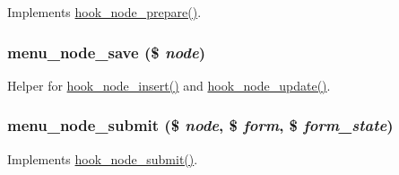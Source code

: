 Implements \hyperlink{group__node__api__hooks_ga4bbe7320bd52fc6183920c8be2d9d4f6}{hook\_\-node\_\-prepare()}. \hypertarget{menu_8module_a8d7834b73f1a9d55e4bc705b6fca3fbf}{
\subsubsection[{menu\_\-node\_\-save}]{\setlength{\rightskip}{0pt plus 5cm}menu\_\-node\_\-save (\$ {\em node})}}
\label{menu_8module_a8d7834b73f1a9d55e4bc705b6fca3fbf}
Helper for \hyperlink{group__node__api__hooks_ga8b40dc62e46e5055c205d2a723dc3548}{hook\_\-node\_\-insert()} and \hyperlink{group__node__api__hooks_gac66c767cc922fcbfdaf17252e5d87d9d}{hook\_\-node\_\-update()}. \hypertarget{menu_8module_a4654aaf42337b6e11074ab43abc66049}{
\subsubsection[{menu\_\-node\_\-submit}]{\setlength{\rightskip}{0pt plus 5cm}menu\_\-node\_\-submit (\$ {\em node}, \/  \$ {\em form}, \/  \$ {\em form\_\-state})}}
\label{menu_8module_a4654aaf42337b6e11074ab43abc66049}
Implements \hyperlink{group__node__api__hooks_ga1b479b731ecb3f9eec0c92e3e1a8e01d}{hook\_\-node\_\-submit()}.

